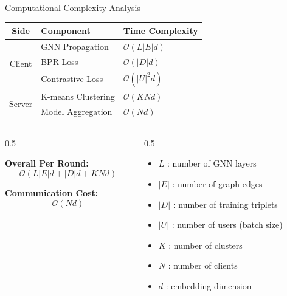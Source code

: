 \documentclass{beamer}
\begin{document}
\begin{frame}{Computational Complexity Analysis}
\small

\begin{table}
\centering
\begin{tabular}{|c|l|l|}
\hline
\textbf{Side} & \textbf{Component} & \textbf{Time Complexity} \\
\hline

\multirow{3}{*}{Client}
 & GNN Propagation & $\mathcal{O}(L |E| d)$ \\
 & BPR Loss & $\mathcal{O}(|D| d)$ \\
 & Contrastive Loss & $\mathcal{O}(|U|^2 d)$ \\
\hline

\multirow{2}{*}{Server}
 & K-means Clustering & $\mathcal{O}(K N d)$ \\
 & Model Aggregation & $\mathcal{O}(N d)$ \\
\hline

\end{tabular}
\end{table}

\vspace{0.001cm}

\begin{columns}

\begin{column}{0.5\textwidth}

\textbf{Overall Per Round:}
\[
\mathcal{O}(L|E|d + |D|d + KNd)
\]

\vspace{0.1cm}

\textbf{Communication Cost:}
\[
\mathcal{O}(Nd)
\]

\end{column}

\begin{column}{0.5\textwidth}

{\scriptsize
\begin{itemize}
    \item $L$ : number of GNN layers
    \item $|E|$ : number of graph edges
    \item $|D|$ : number of training triplets
    \item $|U|$ : number of users (batch size)
    \item $K$ : number of clusters
    \item $N$ : number of clients
    \item $d$ : embedding dimension
\end{itemize}
}

\end{column}

\end{columns}

\end{frame}
\end{document}
